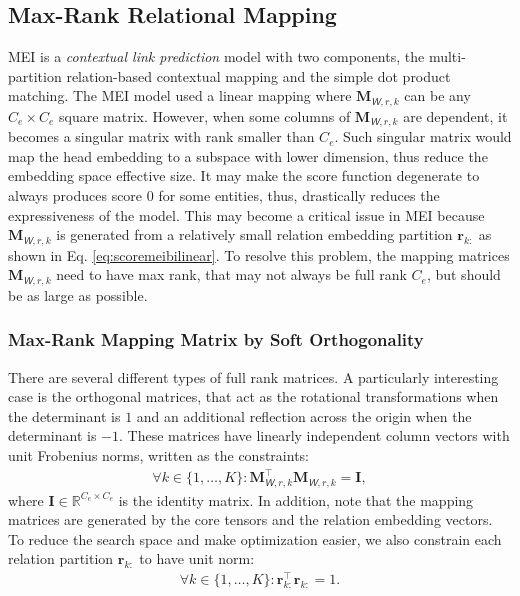 \documentclass{article}
\def\vr{{\bm{r}}}
\def\mI{{\bm{I}}}
\def\mM{{\bm{M}}}
\newcommand{\tens}[1]{\bm{\mathsfit{#1}}}
\def\tW{{\tens{W}}}
\def\sR{{\mathbb{R}}}
\theoremstyle{plain}
\theoremstyle{remark}
\begin{document}
\subsection{Max-Rank Relational Mapping} \label{sect:model_mapping} 





MEI is a \textit{contextual link prediction} model with two components, the multi-partition relation-based contextual mapping and the simple dot product matching. The MEI model used a linear mapping where $ \mM_{\tW, r, k} $ can be any $ C_e \times C_e $ square matrix. However, when some columns of $ \mM_{\tW, r, k} $ are dependent, it becomes a singular matrix with rank smaller than $ C_e $. Such singular matrix would map the head embedding to a subspace with lower dimension, thus reduce the embedding space effective size. It may make the score function degenerate to always produces score $ 0 $ for some entities, thus, drastically reduces the expressiveness of the model. This may become a critical issue in MEI because $ \mM_{\tW, r, k} $ is generated from a relatively small relation embedding partition $ \vr_{k:} $ as shown in Eq. \ref{eq:scoremeibilinear}. To resolve this problem, the mapping matrices $ \mM_{\tW, r, k} $ need to have max rank, that may not always be full rank $ C_e $, but should be as large as possible. 

\subsubsection{Max-Rank Mapping Matrix by Soft Orthogonality}
There are several different types of full rank matrices. A particularly interesting case is the orthogonal matrices, that act as the rotational transformations when the determinant is $ 1 $ and an additional reflection across the origin when the determinant is $ -1 $. These matrices have linearly independent column vectors with unit Frobenius norms, written as the constraints:
\begin{align}
	\forall k \in \{1, \dots, K\}: \mM_{\tW, r, k}^\top \mM_{\tW, r, k} = \mI, \label{eq:constraintorthohard}
\end{align}
where $ \mI \in \sR^{C_e \times C_e} $ is the identity matrix. In addition, note that the mapping matrices are generated by the core tensors and the relation embedding vectors. To reduce the search space and make optimization easier, we also constrain each relation partition $ \vr_{k:} $ to have unit norm:
\begin{align}
	\forall k \in \{1, \dots, K\}: \vr_{k:}^\top \vr_{k:} = 1. \label{eq:constraintunitnormhard}
\end{align}
\end{document}
